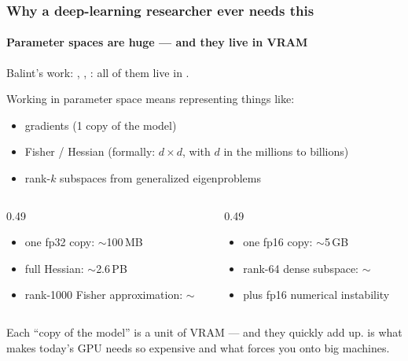 \documentclass[10pt,aspectratio=169,notheorems]{beamer}
\begin{document}
\begin{frame}
    \frametitle{Why a deep-learning researcher ever needs this}
    \framesubtitle{Parameter spaces are huge --- and they live in VRAM}
    Balint's work: , , : all of them live in .

    \vspace{0.5em}
    Working in parameter space means representing things like:
    \begin{itemize}
        \item gradients (1 copy of the model)
        \item Fisher / Hessian (formally: $d \times d$, with $d$ in the millions to billions)
        \item rank-$k$ subspaces from generalized eigenproblems
    \end{itemize}

    \vspace{0.8em}
    \begin{columns}[t]
        \begin{column}{0.49\textwidth}
         \citep{he2016resnet}
        \begin{itemize}
            \item one fp32 copy: $\sim$100\,MB
            \item full Hessian: $\sim$2.6\,PB
            \item rank-1000 Fisher approximation: $\sim$
        \end{itemize}
        \end{column}

        \begin{column}{0.49\textwidth}
         \citep{gemmateam2024gemma2}
        \begin{itemize}
            \item one fp16 copy: $\sim$5\,GB
            \item rank-64 dense subspace: $\sim$
            \item plus fp16 numerical instability
        \end{itemize}
        \end{column}
    \end{columns}

    \vspace{1em}
    \textcolor{SlidemintMuted}{Each ``copy of the model'' is a unit of VRAM --- and they quickly add up.  is what makes today's GPU needs so expensive and what forces you onto big machines.}
\end{frame}
\end{document}
